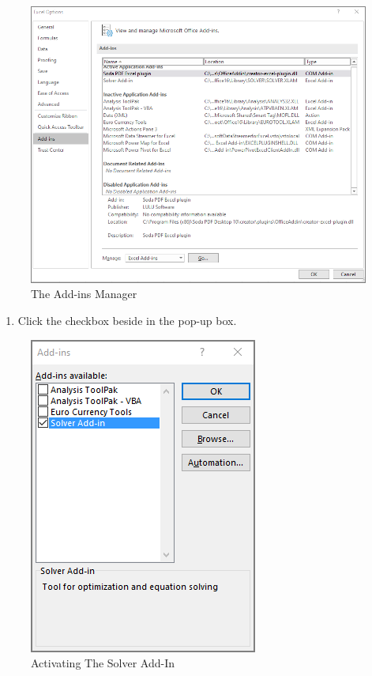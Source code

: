 \begin{figure}[H]
\centering
\includegraphics[width=\maxwidth{.95\linewidth}]{gfx/ch08_fig36}
\caption{The Add-ins Manager}
\label{08:fig36}
\end{figure}

\begin{enumerate}[resume]	
	
	\item Click the checkbox beside  in the  pop-up box.
	
\end{enumerate}

\begin{figure}[H]
	\centering
	\includegraphics[width=\maxwidth{.95\linewidth}]{gfx/ch08_fig37}
	\caption{Activating The Solver Add-In}
	\label{08:fig37}
\end{figure}

